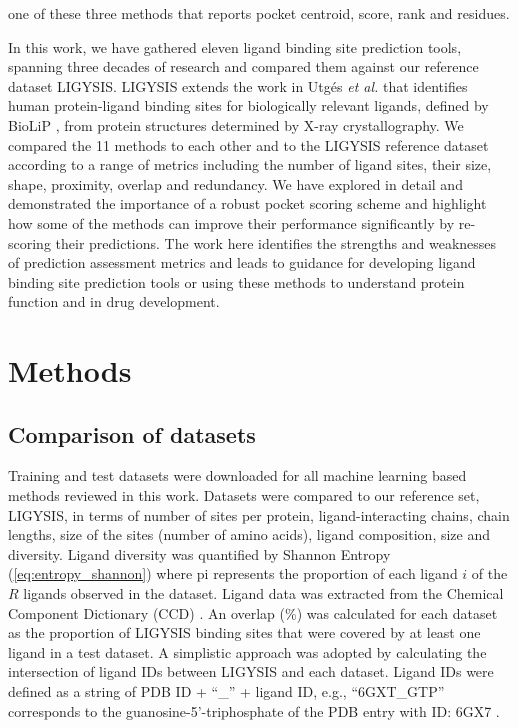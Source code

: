 one of these three methods that reports pocket centroid, score, rank and residues.

In this work, we have gathered eleven ligand binding site prediction tools, spanning three decades of research and compared them against our reference dataset LIGYSIS. LIGYSIS extends the work in Utgés \textit{et al.} \cite{UTGES_2024_FRAGSYS} that identifies human protein-ligand binding sites for biologically relevant ligands, defined by BioLiP \cite{YANG_2013_BIOLIP}, from protein structures determined by X-ray crystallography. We compared the 11 methods to each other and to the LIGYSIS reference dataset according to a range of metrics including the number of ligand sites, their size, shape, proximity, overlap and redundancy. We have explored in detail and demonstrated the importance of a robust pocket scoring scheme and highlight how some of the methods can improve their performance significantly by re-scoring their predictions. The work here identifies the strengths and weaknesses of prediction assessment metrics and leads to guidance for developing ligand binding site prediction tools or using these methods to understand protein function and in drug development.

\section{Methods}

\subsection{Comparison of datasets}

Training and test datasets were downloaded for all machine learning based methods reviewed in this work. Datasets were compared to our reference set, LIGYSIS, in terms of number of sites per protein, ligand-interacting chains, chain lengths, size of the sites (number of amino acids), ligand composition, size and diversity. Ligand diversity was quantified by Shannon Entropy \cite{SHANNON_1948_ENTROPY} (\autoref{eq:entropy_shannon}) where pi represents the proportion of each ligand $i$ of the $R$ ligands observed in the dataset. Ligand data was extracted from the Chemical Component Dictionary (CCD) \cite{WESTBROOK_2015_CCD}. An overlap (\%) was calculated for each dataset as the proportion of LIGYSIS binding sites that were covered by at least one ligand in a test dataset. A simplistic approach was adopted by calculating the intersection of ligand IDs between LIGYSIS and each dataset. Ligand IDs were defined as a string of PDB ID + ``\_'' + ligand ID, e.g., ``6GXT\_GTP'' corresponds to the guanosine-5’-triphosphate of the PDB entry with ID: 6GX7 \cite{CAMPANACCI_2019_TUBULIN}.

